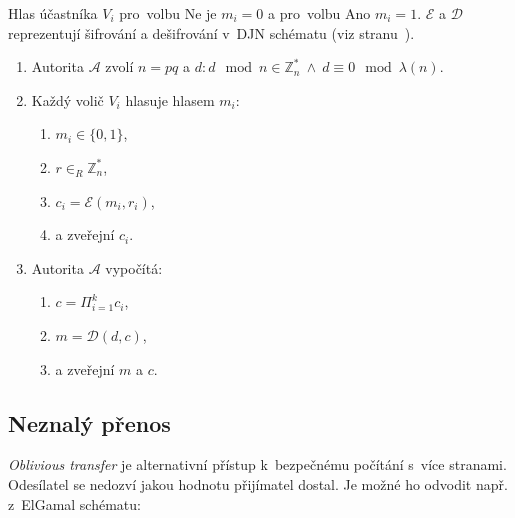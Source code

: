 \begin{mdframed}
Hlas účastníka $V_i$ pro~volbu Ne je $m_i = 0$ a pro~volbu Ano $m_i = 1$.
$\mathcal{E}$ a $\mathcal{D}$ reprezentují šifrování a dešifrování v~DJN schématu (viz stranu~\pageref{fig:paillier-djn}).


\begin{enumerate}
\item Autorita $\mathcal{A}$ zvolí $n = pq$ a $d: d \mod n \in \mathbb{Z}_n^* \ \wedge \ d \equiv 0 \mod \lambda(n)$.
\item Každý volič $V_i$ hlasuje hlasem $m_i$:
    \begin{enumerate}
    \item $m_i \in \{0, 1\}$,
    \item $r \in_R \mathbb{Z}_n^*$,
    \item $c_i = \mathcal{E}(m_i, r_i)$,
    \item a zveřejní $c_i$.
    \end{enumerate}
\item Autorita $\mathcal{A}$ vypočítá:
    \begin{enumerate}
    \item $c = \Pi_{i=1}^k c_i$,
    \item $m = \mathcal{D}(d, c)$,
    \item a zveřejní $m$ a $c$.
    \end{enumerate}
\end{enumerate}
\end{mdframed}


\subsection{Neznalý přenos}

\emph{Oblivious transfer} je alternativní přístup k~bezpečnému počítání s~více stranami.
Odesílatel se nedozví jakou hodnotu přijímatel dostal.
Je možné ho odvodit např. z~ElGamal schématu:

